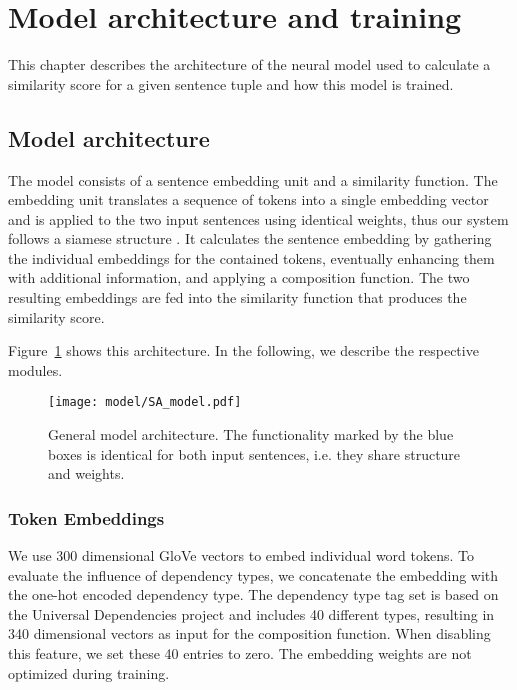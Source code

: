 \section{Model architecture and training}
This chapter describes the architecture of the neural model used to calculate a similarity score for a given sentence tuple and how this model is trained.

\subsection{Model architecture}
The model consists of a sentence embedding unit and a similarity function. The embedding unit translates a sequence of tokens into a single embedding vector and is applied to the two input sentences using identical weights, thus our system follows a siamese structure \autocite{bromley_signature_1994}. %
It calculates the sentence embedding by gathering the individual embeddings for the contained tokens, eventually enhancing them with additional information, and applying a composition function. The two resulting embeddings are fed into the similarity function that produces the similarity score. 

Figure~\ref{fig:model_architecture} shows this architecture. In the following, we describe the respective modules. 

\begin{figure}[htb!]
	\centering
	\texttt{[image: model/SA\_model.pdf]}
	\caption{General model architecture. The functionality marked by the blue boxes is identical for both input sentences, i.e. they share structure and weights.}
	\label{fig:model_architecture}
\end{figure}

\subsubsection{Token Embeddings}
We use 300 dimensional GloVe vectors  \autocite{pennington_glove_2014} to embed individual word tokens. To evaluate the influence of dependency types, we concatenate the embedding with the one-hot encoded dependency type. The dependency type tag set is based on the Universal Dependencies project \autocite{nivre_universal_2016} and includes 40 different types, resulting in 340 dimensional vectors as input for the composition function. When disabling this feature, we set these 40 entries to zero. The embedding weights are not optimized during training.   

